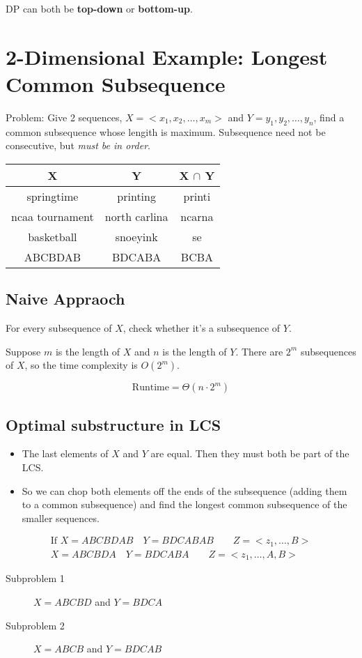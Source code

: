 \documentclass{article}
\begin{document}
DP can both be \textbf{top-down} or \textbf{bottom-up}.

\section*{2-Dimensional Example: Longest Common Subsequence}
Problem: Give 2 sequences, \(X = <x_1, x_2, \dots, x_m>\) and \(Y = y_1, y_2,
\dots, y_n\), find a common subsequence whose lengith is maximum.
Subsequence need not be consecutive, but \emph{must be in order}.
\begin{tabular}{c|c|c}
    X               & Y             & X \(\cap\) Y \\
    \hline
    springtime      & printing      & printi       \\
    ncaa tournament & north carlina & ncarna       \\
    basketball      & snoeyink      & se           \\
    ABCBDAB         & BDCABA        & BCBA         \\
\end{tabular}

\subsection*{Naive Appraoch}
For every subsequence of $X$, check whether it's a subsequence of $Y$.

Suppose \(m\) is the length of \(X\) and \(n\) is the length of \(Y\). There are \(2^m\) subsequences of \(X\), so the time complexity is \(O(2^m)\).

\begin{equation*}
    \text{Runtime} = \Theta(n\cdot2^m)
\end{equation*}

\subsection*{Optimal substructure in LCS}
\begin{itemize}
    \item The last elements of $X$ and $Y$ are equal. Then they must both be part of the LCS.
    \item So we can chop both elements off the ends of the subsequence (adding
          them to a common subsequence) and find the longest common subsequence of the
          smaller sequences.
\end{itemize}

\begin{align*}
    \text{If } X = ABCBDAB \quad Y = BDCABAB \qquad Z = <z_1, \ldots,  B> \\
    X = ABCBDA \quad Y = BDCABA \qquad Z = <z_1, \ldots, A, B>
\end{align*}
\begin{description}
    \item[Subproblem 1] \(X = ABCBD\) and \(Y = BDCA\)
    \item[Subproblem 2] \(X = ABCB\) and \(Y = BDCAB\)
\end{description}
\end{document}
